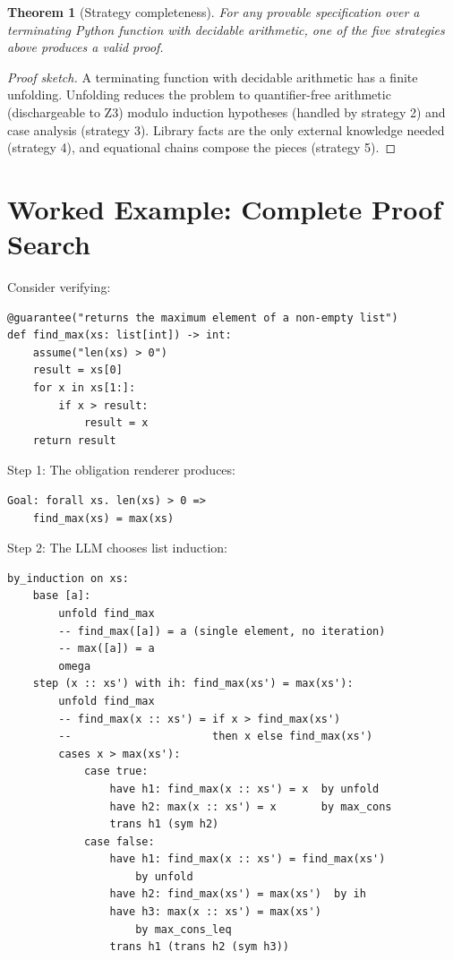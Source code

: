 \documentclass[11pt,a4paper]{report}
\theoremstyle{definition}
\theoremstyle{plain}
\newtheorem{theorem}[definition]{Theorem}
\begin{document}
\begin{theorem}[Strategy completeness]
For any provable specification over a terminating Python function with
decidable arithmetic, one of the five strategies above produces a valid proof.
\end{theorem}
\begin{proof}[Proof sketch]
A terminating function with decidable arithmetic has a finite unfolding.
Unfolding reduces the problem to quantifier-free arithmetic (dischargeable to Z3)
modulo induction hypotheses (handled by strategy 2) and case analysis
(strategy 3).  Library facts are the only external knowledge needed (strategy 4),
and equational chains compose the pieces (strategy 5).
\end{proof}


\section{Worked Example: Complete Proof Search}

Consider verifying:
\begin{lstlisting}[style=synhopy]
@guarantee("returns the maximum element of a non-empty list")
def find_max(xs: list[int]) -> int:
    assume("len(xs) > 0")
    result = xs[0]
    for x in xs[1:]:
        if x > result:
            result = x
    return result
\end{lstlisting}

Step 1: The obligation renderer produces:
\begin{lstlisting}[style=proof]
Goal: forall xs. len(xs) > 0 =>
    find_max(xs) = max(xs)
\end{lstlisting}

Step 2: The LLM chooses list induction:
\begin{lstlisting}[style=proof]
by_induction on xs:
    base [a]:
        unfold find_max
        -- find_max([a]) = a (single element, no iteration)
        -- max([a]) = a
        omega
    step (x :: xs') with ih: find_max(xs') = max(xs'):
        unfold find_max
        -- find_max(x :: xs') = if x > find_max(xs')
        --                      then x else find_max(xs')
        cases x > max(xs'):
            case true:
                have h1: find_max(x :: xs') = x  by unfold
                have h2: max(x :: xs') = x       by max_cons
                trans h1 (sym h2)
            case false:
                have h1: find_max(x :: xs') = find_max(xs')
                    by unfold
                have h2: find_max(xs') = max(xs')  by ih
                have h3: max(x :: xs') = max(xs')
                    by max_cons_leq
                trans h1 (trans h2 (sym h3))
\end{lstlisting}
\end{document}
